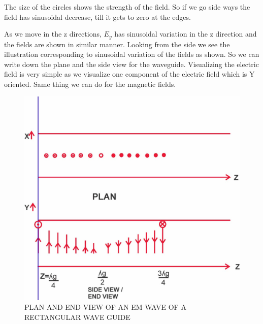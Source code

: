 The size of the circles shows the strength of the field. So if we go side ways the field has sinusoidal decrease, till it gets to zero at the edges.
 
As we move in the z directions, $E_{y}$ has sinusoidal variation in the z direction and the fields are shown in similar manner. Looking from the side we see the illustration corresponding to sinusoidal variation of the fields as shown. 
So we can write down the plane and the side view for the waveguide.
Visualizing the electric field is very simple as we visualize one component of the electric field which is Y oriented. Same thing we can do for the magnetic fields.
\begin{figure}[h]
\centering
\includegraphics[width=1\linewidth]{./graphics/lecture-image-3.jpg}
\caption{PLAN AND END VIEW OF AN EM WAVE OF A RECTANGULAR WAVE GUIDE}
\end{figure}

